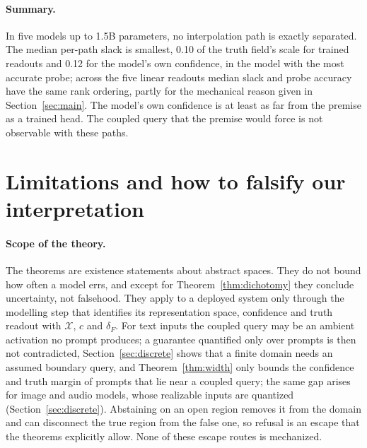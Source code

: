 \documentclass[10pt]{article}
\theoremstyle{definition}
\theoremstyle{remark}
\newcommand{\X}{\mathcal{X}}
\newcommand{\conf}{c}
\newcommand{\dF}{\delta_{\!F}}
\begin{document}
\paragraph{Summary.}
In five models up to 1.5B parameters, no interpolation path is exactly
separated. The median per-path slack is smallest, 0.10 of the truth
field's scale for trained readouts and 0.12 for the model's own
confidence, in the model with the most accurate probe; across the five
linear readouts median slack and probe accuracy have the same rank
ordering, partly for the mechanical reason given in
Section~\ref{sec:main}. The model's own confidence is at least as far
from the premise as a trained head. The coupled query that the premise would
force is not observable with these paths.


\section{Limitations and how to falsify our interpretation}
\label{sec:limits}

\paragraph{Scope of the theory.}
The theorems are existence statements about abstract spaces. They do not
bound how often a model errs, and except for
Theorem~\ref{thm:dichotomy} they conclude uncertainty, not falsehood.
They apply to a deployed system only through the modelling step that
identifies its representation space, confidence and truth readout with
$\X$, $\conf$ and $\dF$. For text inputs the coupled query may be an
ambient activation no prompt produces; a guarantee quantified only over
prompts is then not contradicted, Section~\ref{sec:discrete} shows that a
finite domain needs an assumed boundary query, and
Theorem~\ref{thm:width} only bounds the confidence and truth margin of
prompts that lie near a coupled query; the same gap arises for image and
audio models, whose realizable inputs are quantized
(Section~\ref{sec:discrete}). Abstaining on an open region removes it from
the domain and can disconnect the true region from the false one, so
refusal is an escape that the theorems explicitly allow. None of these
escape routes is mechanized.
\end{document}

